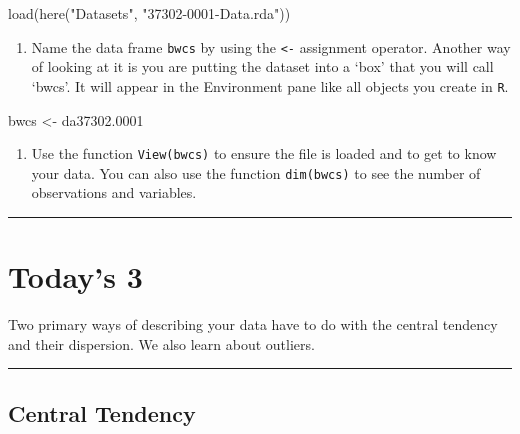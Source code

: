 \documentclass[
]{book}
\newenvironment{Shaded}{\begin{snugshade}}{\end{snugshade}}
\newcommand{\FloatTok}[1]{\textcolor[rgb]{0.00,0.00,0.81}{#1}}
\newcommand{\FunctionTok}[1]{\textcolor[rgb]{0.00,0.00,0.00}{#1}}
\newcommand{\NormalTok}[1]{#1}
\newcommand{\OtherTok}[1]{\textcolor[rgb]{0.56,0.35,0.01}{#1}}
\newcommand{\StringTok}[1]{\textcolor[rgb]{0.31,0.60,0.02}{#1}}
\providecommand{\tightlist}{%
  \setlength{\itemsep}{0pt}\setlength{\parskip}{0pt}}
\begin{document}
\begin{Shaded}
\begin{Highlighting}[]
\FunctionTok{load}\NormalTok{(}\FunctionTok{here}\NormalTok{(}\StringTok{"Datasets"}\NormalTok{, }\StringTok{"37302{-}0001{-}Data.rda"}\NormalTok{))}
\end{Highlighting}
\end{Shaded}

\begin{enumerate}
\def\labelenumi{\arabic{enumi}.}
\setcounter{enumi}{5}
\tightlist
\item
  Name the data frame \texttt{bwcs} by using the \texttt{\textless{}-} assignment operator. Another way of looking at it is you are putting the dataset into a `box' that you will call `bwcs'. It will appear in the Environment pane like all objects you create in \texttt{R}.
\end{enumerate}

\begin{Shaded}
\begin{Highlighting}[]
\NormalTok{bwcs }\OtherTok{\textless{}{-}}\NormalTok{ da37302}\FloatTok{.0001}
\end{Highlighting}
\end{Shaded}

\begin{enumerate}
\def\labelenumi{\arabic{enumi}.}
\setcounter{enumi}{6}
\tightlist
\item
  Use the function \texttt{View(bwcs)} to ensure the file is loaded and to get to know your data. You can also use the function \texttt{dim(bwcs)} to see the number of observations and variables.
\end{enumerate}

\begin{center}\rule{0.5\linewidth}{0.5pt}\end{center}

\hypertarget{todays-3-1}{%
\section{Today's 3}\label{todays-3-1}}

Two primary ways of describing your data have to do with the central tendency and their dispersion. We also learn about outliers.

\begin{center}\rule{0.5\linewidth}{0.5pt}\end{center}

\hypertarget{central-tendency}{%
\subsection{Central Tendency}\label{central-tendency}}
\end{document}
